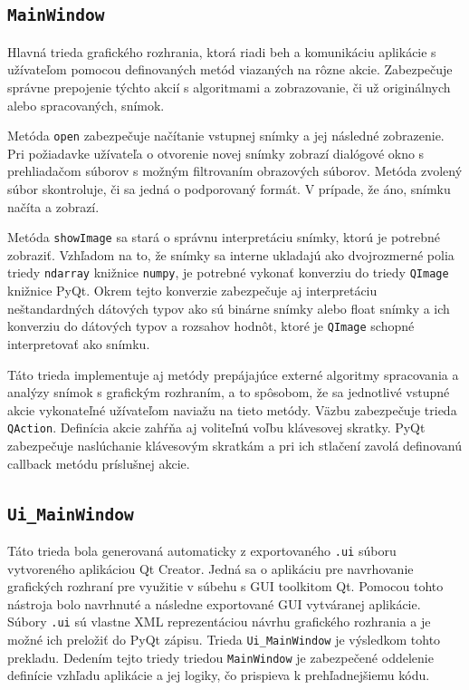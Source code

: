   \subsection{\texttt{MainWindow}}
  Hlavná trieda grafického rozhrania, ktorá riadi beh a komunikáciu aplikácie s užívateľom pomocou definovaných metód viazaných na rôzne akcie.
  Zabezpečuje správne prepojenie týchto akcií s algoritmami a zobrazovanie, či už originálnych alebo spracovaných, snímok.

  Metóda \texttt{open} zabezpečuje načítanie vstupnej snímky a jej následné zobrazenie. Pri požiadavke užívateľa o otvorenie novej snímky zobrazí
  dialógové okno s prehliadačom súborov s možným filtrovaním obrazových súborov. Metóda zvolený súbor skontroluje, či sa jedná o podporovaný formát.
  V prípade, že áno, snímku načíta a zobrazí.

  Metóda \texttt{showImage} sa stará o správnu interpretáciu snímky, ktorú je potrebné zobraziť. Vzhľadom na to, že snímky sa interne ukladajú ako
  dvojrozmerné polia triedy \texttt{ndarray} knižnice \texttt{numpy}, je potrebné vykonať konverziu do triedy \texttt{QImage} knižnice PyQt. Okrem tejto
  konverzie zabezpečuje aj interpretáciu neštandardných dátových typov ako sú binárne snímky alebo float snímky a ich konverziu do dátových typov a rozsahov
  hodnôt, ktoré je \texttt{QImage} schopné interpretovať ako snímku.

  Táto trieda implementuje aj metódy prepájajúce externé algoritmy spracovania a analýzy snímok s grafickým rozhraním, a to spôsobom, že sa jednotlivé
  vstupné akcie vykonateľné užívateľom naviažu na tieto metódy. Väzbu zabezpečuje trieda \texttt{QAction}. Definícia akcie zahŕňa aj voliteľnú  voľbu
  klávesovej skratky. PyQt zabezpečuje naslúchanie klávesovým skratkám a pri ich stlačení zavolá definovanú callback metódu príslušnej akcie.

  \subsection{\texttt{Ui\_MainWindow}}
  Táto trieda bola generovaná automaticky z exportovaného \texttt{.ui} súboru vytvoreného aplikáciou Qt Creator. Jedná sa o aplikáciu pre navrhovanie
  grafických rozhraní pre využitie v súbehu s GUI toolkitom Qt. Pomocou tohto nástroja bolo navrhnuté a následne exportované GUI vytváranej aplikácie. Súbory
  \texttt{.ui} sú vlastne XML reprezentáciou návrhu grafického rozhrania a je možné ich preložiť do PyQt zápisu. Trieda \texttt{Ui\_MainWindow} je výsledkom
  tohto prekladu. Dedením tejto triedy triedou \texttt{MainWindow} je zabezpečené oddelenie definície vzhľadu aplikácie a jej logiky, čo prispieva k
  prehľadnejšiemu kódu.

